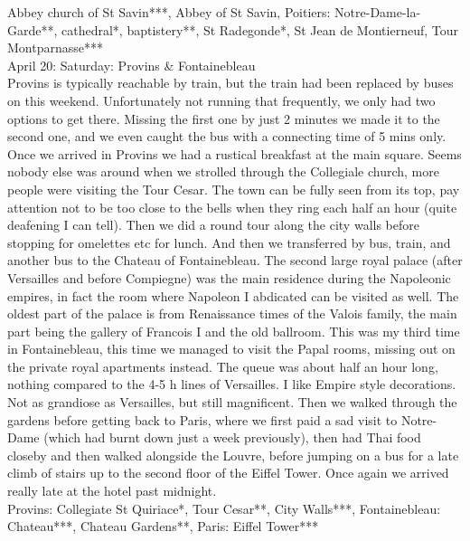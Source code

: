 Abbey church of St Savin***, Abbey of St Savin, Poitiers: Notre-Dame-la-Garde**, cathedral*, baptistery**, St Radegonde*, St Jean de Montierneuf, Tour Montparnasse***\\

April 20: Saturday: Provins \& Fontainebleau\\
Provins is typically reachable by train, but the train had been replaced by buses on this weekend. Unfortunately not running that frequently, we only had two options to get there. Missing the first one by just 2 minutes we made it to the second one, and we even caught the bus with a connecting time of 5 mins only. Once we arrived in Provins we had a rustical breakfast at the main square. Seems nobody else was around when we strolled through the Collegiale church, more people were visiting the Tour Cesar. The town can be fully seen from its top, pay attention not to be too close to the bells when they ring each half an hour (quite deafening I can tell). Then we did a round tour along the city walls before stopping for omelettes etc for lunch. And then we transferred by bus, train, and another bus to the Chateau of Fontainebleau. The second large royal palace (after Versailles and before Compiegne) was the main residence during the Napoleonic empires, in fact the room where Napoleon I abdicated can be visited as well. The oldest part of the palace is from Renaissance times of the Valois family, the main part being the gallery of Francois I and the old ballroom. This was my third time in Fontainebleau, this time we managed to visit the Papal rooms, missing out on the private royal apartments instead. The queue was about half an hour long, nothing compared to the 4-5 h lines of Versailles. I like Empire style decorations. Not as grandiose as Versailles, but still magnificent. Then we walked through the gardens before getting back to Paris, where we first paid a sad visit to Notre-Dame (which had burnt down just a week previously), then had Thai food closeby and then walked alongside the Louvre, before jumping on a bus for a late climb of stairs up to the second floor of the Eiffel Tower. Once again we arrived really late at the hotel past midnight.\\

Provins: Collegiate St Quiriace*, Tour Cesar**, City Walls***, Fontainebleau: Chateau***, Chateau Gardens**, Paris: Eiffel Tower***\\

